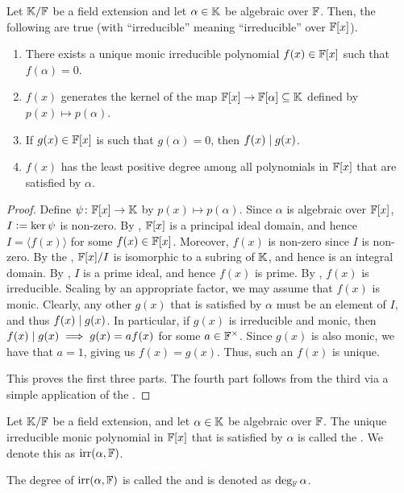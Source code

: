\begin{prop} \label{prop:irreducible-monic-poly}
    Let $\mathbb{K}/\mathbb{F}$ be a field extension and let $\alpha \in\mathbb{K}$ be algebraic over $\mathbb{F}$. Then, the following are true (with ``irreducible'' meaning ``irreducible'' over $\mathbb{F}[x]$). 
    \begin{enumerate}
        \item There exists a unique monic irreducible polynomial $f(x) \in \mathbb{F}[x]$ such that $f(\alpha) = 0$.
        \item $f(x)$ generates the kernel of the map $\mathbb{F}[x] \to \mathbb{F}[\alpha] \subseteq \mathbb{K}$ defined by $p(x) \mapsto p(\alpha)$.
        \item If $g(x) \in \mathbb{F}[x]$ is such that $g(\alpha) = 0$, then $f(x) \mid g(x)$.
        \item $f(x)$ has the least positive degree among all polynomials in $\mathbb{F}[x]$ that are satisfied by $\alpha$. 
    \end{enumerate}
\end{prop}
\begin{proof}
    Define $\psi \colon \mathbb{F}[x] \to \mathbb{K}$ by $p(x) \mapsto p(\alpha)$. Since $\alpha$ is algebraic over $\mathbb{F}[x]$, $I \vcentcolon= \ker\psi$ is non-zero. By , $\mathbb{F}[x]$ is a principal ideal domain, and hence $I = \langle f(x) \rangle$ for some $f(x) \in \mathbb{F}[x]$. Moreover, $f(x)$ is non-zero since $I$ is non-zero. By the , $\mathbb{F}[x]/I$ is isomorphic to a subring of $\mathbb{K}$, and hence is an integral domain. By , $I$ is a prime ideal, and hence $f(x)$ is prime. By , $f(x)$ is irreducible. Scaling by an appropriate factor, we may assume that $f(x)$ is monic. Clearly, any other $g(x)$ that is satisfied by $\alpha$ must be an element of $I$, and thus $f(x) \mid g(x)$. In particular, if $g(x)$ is irreducible and monic, then $f(x) \mid g(x) \implies g(x) = af(x)$ for some $a \in \mathbb{F}^{\times}$. Since $g(x)$ is also monic, we have that $a = 1$, giving us $f(x) = g(x)$. Thus, such an $f(x)$ is unique.
    
    This proves the first three parts. The fourth part follows from the third via a simple application of the .
\end{proof}

\begin{defn}
    Let $\mathbb{K}/\mathbb{F}$ be a field extension, and let $\alpha \in \mathbb{K}$ be algebraic over $\mathbb{F}$. The unique irreducible monic polynomial in $\mathbb{F}[x]$ that is satisfied by $\alpha$ is called the . We denote this as $\operatorname{irr}(\alpha, \mathbb{F})$.
    
    The degree of $\operatorname{irr}(\alpha, \mathbb{F})$ is called the  and is denoted as $\deg_{\mathbb{F}}\alpha$.
\end{defn}


